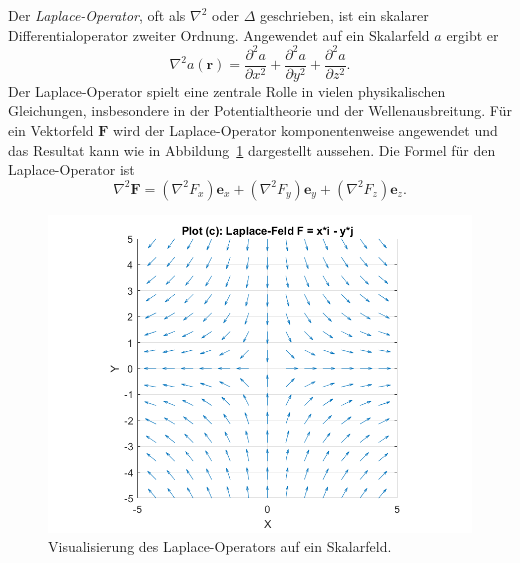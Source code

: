 Der \emph{Laplace-Operator}, oft als $\nabla^2$ oder $\Delta$ geschrieben,
%
%
%
ist ein skalarer Differentialoperator zweiter Ordnung.
Angewendet auf ein Skalarfeld $a$ ergibt er
\begin{equation*}
\nabla^2 a(\boldsymbol{r})
=
\frac{\partial^2 a}{\partial x^2}
+
\frac{\partial^2 a}{\partial y^2}
+
\frac{\partial^2 a}{\partial z^2}.
\end{equation*}
Der Laplace-Operator spielt eine zentrale Rolle in vielen physikalischen Gleichungen, insbesondere in der Potentialtheorie und der Wellenausbreitung.
%
%
Für ein Vektorfeld $\boldsymbol{F}$ wird der Laplace-Operator
komponentenweise angewendet und das Resultat kann wie in
Abbildung~\ref{fig:LaplaceAlg} dargestellt aussehen.
Die Formel für den Laplace-Operator ist
\begin{equation}
\nabla^2 \boldsymbol{F} = (\nabla^2 F_x)\boldsymbol{e}_x + (\nabla^2 F_y)\boldsymbol{e}_y + (\nabla^2 F_z)\boldsymbol{e}_z.
\end{equation}

\begin{figure}
    \centering
    \includegraphics[scale=0.4]{papers/helmholtz/images/Laplace_Feld.png}
    \caption{Visualisierung des Laplace-Operators auf ein Skalarfeld.}
    \label{fig:LaplaceAlg}
\end{figure}


